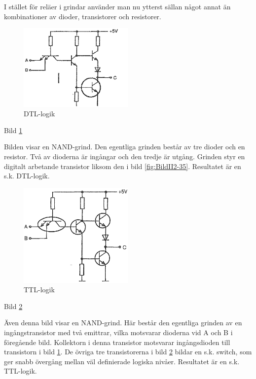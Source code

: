 I stället för reläer i grindar använder man nu ytterst sällan något annat än
kombinationer av dioder, transistorer och resistorer.

\begin{figure}
\includegraphics[width=0.5\textwidth]{images/bild_2_2-44.png}
\caption{DTL-logik}
\label{fig:BildII2-44}
\end{figure}

Bild \ref{fig:BildII2-44}

Bilden visar en NAND-grind. Den egentliga grinden består av tre dioder och en
resistor. Två av dioderna är ingångar och den tredje är utgång. Grinden styr en
digitalt arbetande transistor liksom den i bild \ref{fig:BildII2-35}.
Resultatet är en s.k. DTL-logik.

\begin{figure}
\includegraphics[width=0.5\textwidth]{images/bild_2_2-45.png}
\caption{TTL-logik}
\label{fig:BildII2-45}
\end{figure}

Bild \ref{fig:BildII2-45}

Även denna bild visar en NAND-grind. Här består den egentliga grinden av en
ingångstransistor med två emittrar, vilka motsvarar dioderna vid A och B i
föregående bild. Kollektorn i denna transistor motsvarar ingångsdioden till
transistorn i bild \ref{fig:BildII2-44}. De övriga tre transistorerna i bild
\ref{fig:BildII2-45} bildar en s.k. switch, som ger snabb övergång mellan väl
definierade logiska nivåer. Resultatet är en s.k. TTL-logik.
